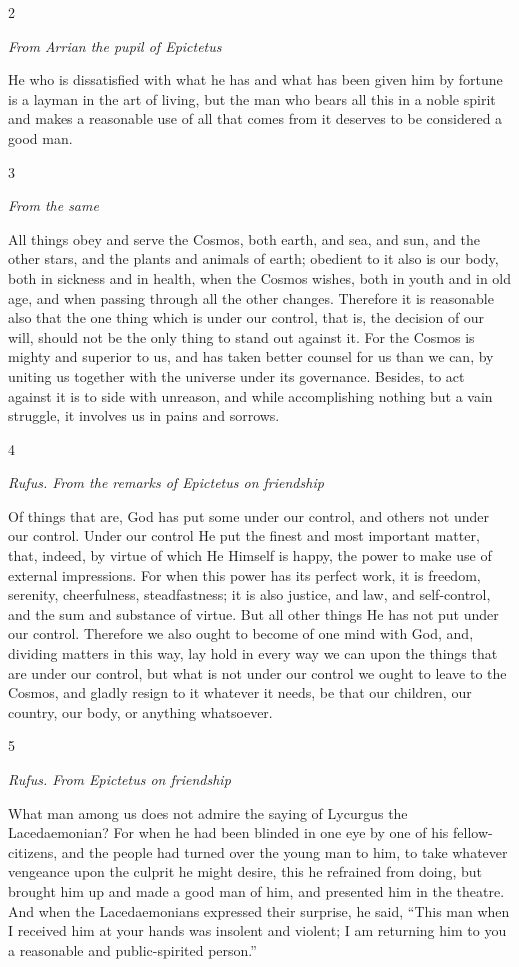 2

\emph{From Arrian the pupil of Epictetus}

He who is dissatisfied with what he has and what has been given him by fortune is a layman in the art of living, but the man who bears all this in a noble spirit and makes a reasonable use of all that comes from it deserves to be considered a good man.

3

\emph{From the same}

All things obey and serve the Cosmos, both earth, and sea, and sun, and the other stars, and the plants and animals of earth; obedient to it also is our body, both in sickness and in health, when the Cosmos wishes, both in youth and in old age, and when passing through all the other changes. Therefore it is reasonable also that the one thing which is under our control, that is, the decision of our will, should not be the only thing to stand out against it. For the Cosmos is mighty and superior to us, and has taken better counsel for us than we can, by uniting us together with the universe under its governance. Besides, to act against it is to side with unreason, and while accomplishing nothing but a vain struggle, it involves us in pains and sorrows.

4

\emph{Rufus. From the remarks of Epictetus on friendship}

Of things that are, God has put some under our control, and others not under our control. Under our control He put the finest and most important matter, that, indeed, by virtue of which He Himself is happy, the power to make use of external impressions. For when this power has its perfect work, it is freedom, serenity, cheerfulness, steadfastness; it is also justice, and law, and self-control, and the sum and substance of virtue. But all other things He has not put under our control. Therefore we also ought to become of one mind with God, and, dividing matters in this way, lay hold in every way we can upon the things that are under our control, but what is not under our control we ought to leave to the Cosmos, and gladly resign to it whatever it needs, be that our children, our country, our body, or anything whatsoever.

5

\emph{Rufus. From Epictetus on friendship}

What man among us does not admire the saying of Lycurgus the Lacedaemonian? For when he had been blinded in one eye by one of his fellow-citizens, and the people had turned over the young man to him, to take whatever vengeance upon the culprit he might desire, this he refrained from doing, but brought him up and made a good man of him, and presented him in the theatre. And when the Lacedaemonians expressed their surprise, he said, ``This man when I received him at your hands was insolent and violent; I am returning him to you a reasonable and public-spirited person.''

